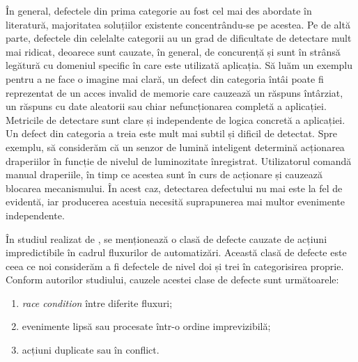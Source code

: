În general, defectele din prima categorie au fost cel mai des abordate în literatură, majoritatea soluțiilor existente concentrându-se pe acestea. Pe de altă parte, defectele din celelalte categorii au un grad de dificultate de detectare mult mai ridicat, deoarece sunt cauzate, în general, de concurență și sunt în strânsă legătură cu domeniul specific în care este utilizată aplicația. Să luăm un exemplu pentru a ne face o imagine mai clară, un defect din categoria întâi poate fi reprezentat de un acces invalid de memorie care cauzează un răspuns întârziat, un răspuns cu date aleatorii sau chiar nefuncționarea completă a aplicației. Metricile de detectare sunt clare și independente de logica concretă a aplicației. Un defect din categoria a treia este mult mai subtil și dificil de detectat. Spre exemplu, să considerăm că un senzor de lumină inteligent determină acționarea draperiilor în funcție de nivelul de luminozitate înregistrat. Utilizatorul comandă manual draperiile, în timp ce acestea sunt în curs de acționare și cauzează blocarea mecanismului. În acest caz, detectarea defectului nu mai este la fel de evidentă, iar producerea acestuia necesită suprapunerea mai multor evenimente independente. 

În studiul realizat de \citet{Zhou2021}, se menționează o clasă de defecte cauzate de acțiuni impredictibile în cadrul fluxurilor de automatizări. Această clasă de defecte este ceea ce noi considerăm a fi defectele de nivel doi și trei în categorisirea proprie. Conform autorilor studiului, cauzele acestei clase de defecte sunt următoarele:

\begin{enumerate}
    \item \textit{race condition} între diferite fluxuri;
    \item evenimente lipsă sau procesate într-o ordine imprevizibilă;
    \item acțiuni duplicate sau în conflict.
\end{enumerate}


